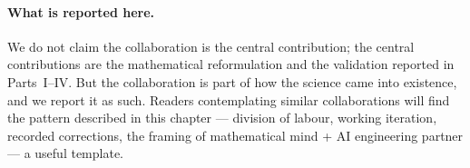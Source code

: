 \paragraph{What is reported here.}
We do not claim the collaboration is the central contribution; the central contributions are the mathematical reformulation and the validation reported in Parts~I--IV. But the collaboration is part of how the science came into existence, and we report it as such. Readers contemplating similar collaborations will find the pattern described in this chapter --- division of labour, working iteration, recorded corrections, the framing of mathematical mind + AI engineering partner --- a useful template.

